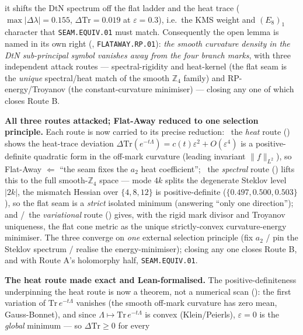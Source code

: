 it shifts the DtN spectrum off the flat ladder and the heat trace ($\max|\Delta\lambda|=0.155$,
$\Delta\mathrm{Tr}=0.019$ at $\varepsilon=0.3$), i.e.\ the KMS weight and $(E_8)_1$ character that
\texttt{SEAM.EQUIV.01} must match. Consequently the open lemma is named in its own right
(, \texttt{FLATAWAY.RP.01}): \emph{the smooth curvature density in the DtN
sub-principal symbol vanishes away from the four branch marks}, with three independent attack routes ---
spectral-rigidity and heat-kernel (the flat seam is the \emph{unique} spectral/heat match of the smooth
$\mathbb{Z}_4$ family) and RP-energy/Troyanov (the constant-curvature minimiser) --- closing any one of which
closes Route B.
\par\smallskip\noindent\textbf{All three routes attacked; Flat-Away reduced to one selection principle.} Each
route is now carried to its precise reduction: \mE\ the \emph{heat} route
() shows the heat-trace deviation
$\Delta\mathrm{Tr}(e^{-t\Lambda})=c(t)\varepsilon^2+O(\varepsilon^4)$ is a positive-definite quadratic form in
the off-mark curvature (leading invariant $\|f\|_{L^2}$), so Flat-Away $\Leftarrow$ ``the seam fixes the $a_2$
heat coefficient''; \mE\ the \emph{spectral} route () lifts this to
the full smooth-$\mathbb{Z}_4$ space --- mode $4k$ splits the degenerate Steklov level $|2k|$, the mismatch
Hessian over $\{4,8,12\}$ is positive-definite ($\{0.497,0.500,0.503\}$), so the flat seam is a \emph{strict}
isolated minimum (answering ``only one direction''); and \mE/\mC\ the \emph{variational} route
() gives, with the rigid mark divisor and Troyanov uniqueness, the flat cone
metric as the unique strictly-convex curvature-energy minimiser. The three converge on \emph{one} external
selection principle (fix $a_2$ / pin the Steklov spectrum / realise the energy-minimiser); closing any one
closes Route B, and with Route A's holomorphy half, \texttt{SEAM.EQUIV.01}.
\par\smallskip\noindent\textbf{The heat route made exact and Lean-formalised.} The positive-definiteness
underpinning the heat route is now a theorem, not a numerical scan
(): the first variation of $\mathrm{Tr}\,e^{-t\Lambda}$ vanishes (the
smooth off-mark curvature has zero mean, Gauss-Bonnet), and since $\Lambda\mapsto\mathrm{Tr}\,e^{-t\Lambda}$ is
convex (Klein/Peierls), $\varepsilon{=}0$ is the \emph{global} minimum --- so $\Delta\mathrm{Tr}\ge0$ for every

